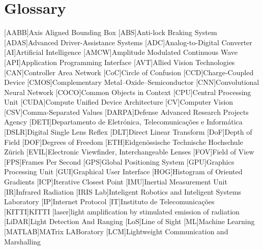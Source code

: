 \chapter{Glossary}

\footnotesize
\SingleSpacing

\begin{multicols}{2} 
\begin{acronym}[AAAAAA]
	[AABB]{Axis Aligned Bounding Box}
	[ABS]{Anti-lock Braking System}
	[ADAS]{Advanced Driver-Assistance Systems}
	[ADC]{Analog-to-Digital Converter}
	[AI]{Artificial Intelligence}
	[AMCW]{Amplitude Modulated Continuous Wave}
	[API]{Application Programming Interface}
	[AVT]{Allied Vision Technologies}
	[CAN]{Controller Area Network} 
	[CoC]{Circle of Confusion}
	[CCD]{Charge-Coupled Device}
	[CMOS]{Complementary Metal–Oxide–Semiconductor}
	[CNN]{Convolutional Neural Network}
	[COCO]{Common Objects in Context}
	[CPU]{Central Processing Unit}
	[CUDA]{Compute Unified Device Architecture}
	[CV]{Computer Vision}
	[CSV]{Comma-Separated Values}
	[DARPA]{Defense Advanced Research Projects Agency}
	[DETI]{Departamento de Eletrónica, Telecomunicações e Informática}
	[DSLR]{Digital Single Lens Reflex}
	[DLT]{Direct Linear Transform}
	[DoF]{Depth of Field}
	[DOF]{Degrees of Freedom}
	[ETH]{Eidgenössische Technische Hochschule Zürich}
	[EVIL]{Electronic Viewfinder, Interchangeable Lenses}
	[FOV]{Field of View}
	[FPS]{Frames Per Second}
	[GPS]{Global Positioning System}
	[GPU]{Graphics Processing Unit}
	[GUI]{Graphical User Interface}
	[HOG]{Histogram of Oriented Gradients}
	[ICP]{Iterative Closest Point}
	[IMU]{Inertial Measurement Unit}
	[IR]{Infrared Radiation}
	[IRIS Lab]{Inteligent Robotics and Inteligent Systems Laboratory}
	[IP]{Internet Protocol}
	[IT]{Instituto de Telecomunicações}
	[KITTI]{KITTI}
	[laser]{light amplification by stimulated emission of radiation}
	[LiDAR]{Light Detection And Ranging}
	[LoS]{Line of Sight}
	[ML]{Machine Learning}
	[MATLAB\textsuperscript{\tiny\textregistered}]{MATrix LABoratory\textsuperscript{\tiny\textregistered}}
	[LCM]{Lightweight Communication and Marshalling}

\end{acronym}
\end{multicols}
